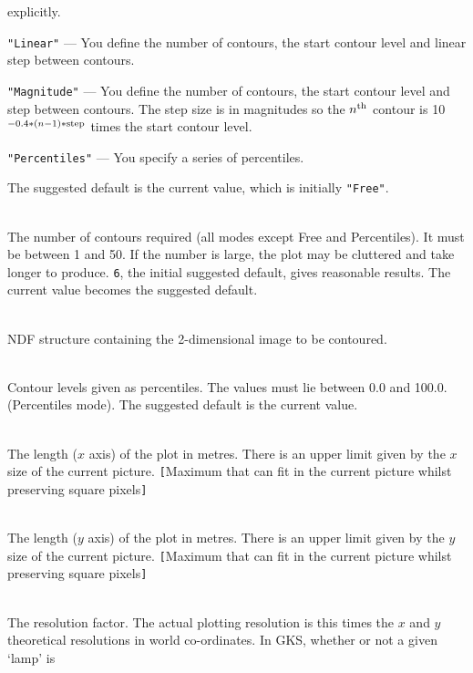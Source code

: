 \documentclass[twoside,11pt]{article}
\newcommand{\sstsubsection}[1]{ \item[{#1}] \mbox{} \\}
\newcommand{\sstsubsection}[1]{\item[{#1}]}
\begin{document}
{{{\begin{description}
                        explicitly.
         \item {\tt "Linear"} --- You define the number of contours, the start
                        contour level and linear step between contours.
         \item {\tt "Magnitude"} --- You define the number of contours, the start
                        contour level and step between contours.  The
                        step size is in magnitudes so the $n^{\rm th}$
                        contour is 10$^{-0.4*(n-1)*{\rm step}}$ times the
                        start contour level.
         \item {\tt "Percentiles"} --- You specify a series of percentiles.
         \end{description}

         The suggested default is the current value, which is initially
         {\tt "Free"}.
      }
      \sstsubsection{
         NCONT = \_INTEGER (Read)
      }{
         The number of contours required (all modes except Free and
         Percentiles).  It must be between 1 and 50.  If the number is
         large, the plot may be cluttered and take longer to produce.
         {\tt 6}, the initial suggested default, gives reasonable results.
         The current value becomes the suggested default.
      }
      \sstsubsection{
         NDF = NDF (Read)
      }{
         NDF structure containing the 2-dimensional image to be contoured.
      }
      \sstsubsection{
         PERCENTILES() = \_REAL (Read)
      }{
         Contour levels given as percentiles.  The values must lie
         between 0.0 and 100.0. (Percentiles mode).  The suggested
         default is the current value.
      }
      \sstsubsection{
         PXSIZE = \_REAL (Read)
      }{
         The length ($x$ axis) of the plot in metres.  There is an upper
         limit given by the $x$ size of the current picture.
         {\tt [}Maximum that can fit in the current picture whilst
         preserving square pixels{\tt ]}
      }
      \sstsubsection{
         PYSIZE = \_REAL (Read)
      }{
         The length ($y$ axis) of the plot in metres.  There is an upper
         limit given by the $y$ size of the current picture.
         {\tt [}Maximum that can fit in the current picture whilst
         preserving square pixels{\tt ]}
      }
      \sstsubsection{
         RESOLUTION = \_REAL (Read)
      }{
         The resolution factor. The actual plotting resolution is this
         times the $x$ and $y$ theoretical resolutions in world
         co-ordinates.  In GKS, whether or not a given `lamp' is
}}}
\end{document}
